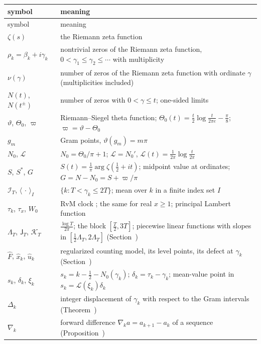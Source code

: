 \documentclass[preprint,12pt]{elsarticle}
\makeatletter
\let\CG@origref\ref
\let\CG@origeqref\eqref
\newcommand{\CG@gettip}[1]{\@ifundefined{CGTip@#1}{Reference: #1}{\csname CGTip@#1\endcsname}}
\DeclareRobustCommand{\CGref}[1]{\pdftooltip{\CG@origref{#1}}{\CG@gettip{#1}}}
\DeclareRobustCommand{\CGeqref}[1]{\pdftooltip{\CG@origeqref{#1}}{\CG@gettip{#1}}}
\numberwithin{equation}{section}
\theoremstyle{plain}
\theoremstyle{definition}
\theoremstyle{remark}
\newcommand{\NO}{N_0}
\newcommand{\lL}{\mathcal L}
\newcommand{\IT}{\mathcal I_T}
\makeatother
\begin{document}
\begin{center}
\small
\begin{longtable}{p{}p{}}
\toprule
symbol & meaning\\
\midrule
\endfirsthead
\toprule
symbol & meaning\\
\midrule
\endhead
\bottomrule
\endfoot
$\zeta(s)$ & the Riemann zeta function\\
$\rho_k=\beta_k+i\gamma_k$ & nontrivial zeros of the Riemann zeta function, $0<\gamma_1\le\gamma_2\le\cdots$ with multiplicity\\
$\nu(\gamma)$ & number of zeros of the Riemann zeta function with ordinate $\gamma$ (multiplicities included)\\
$N(t)$, $N(t^\pm)$ & number of zeros with $0<\gamma\le t$; one-sided limits\\
$\vartheta$, $\Theta_0$, $\varpi$ & Riemann--Siegel theta function; $\Theta_0(t)=\frac t2\log\frac t{2\pi e}-\frac\pi8$; $\varpi=\vartheta-\Theta_0$\\
$g_m$ & Gram points, $\vartheta(g_m)=m\pi$\\
$\NO$, $\lL$ & $\NO=\Theta_0/\pi+1$; $\lL=\NO'$, $\lL(t)=\frac1{2\pi}\log\frac t{2\pi}$\\
$S$, $S^*$, $G$ & $S(t)=\frac1\pi\arg\zeta(\frac12+it)$; midpoint value at ordinates; $G=N-\NO=S+\varpi/\pi$\\
$\IT$, $\langle\,\cdot\,\rangle_I$ & $\{k:T<\gamma_k\le2T\}$; mean over $k$ in a finite index set $I$\\
$\tau_k$, $\tau_x$, $W_0$ & RvM clock \CGeqref{eq:clock}; the same for real $x\ge1$; principal Lambert function\\
$\Lambda_T$, $\mathsf J_T$, $\mathcal K_T$ & $\frac{\log T}{2\pi}$; the block $[\frac T2,3T]$; piecewise linear functions with slopes in $[\frac12\Lambda_T,2\Lambda_T]$ (Section~\CGref{sec:regularized})\\
$\widehat F$, $\widehat x_k$, $\widehat u_k$ & regularized counting model, its level points, its defect at $\gamma_k$ (Section~\CGref{sec:regularized})\\
$s_k$, $\delta_k$, $\xi_k$ & $s_k=k-\frac12-\NO(\gamma_k)$; $\delta_k=\tau_k-\gamma_k$; mean-value point in $s_k=\lL(\xi_k)\delta_k$\\
$\Delta_k$ & integer displacement of $\gamma_k$ with respect to the Gram intervals (Theorem~\CGref{thm:known_korolev})\\
$\nabla_k$ & forward difference $\nabla_ka=a_{k+1}-a_k$ of a sequence (Proposition~\CGref{prop:deformation})\\

\end{longtable}
\end{center}
\end{document}

